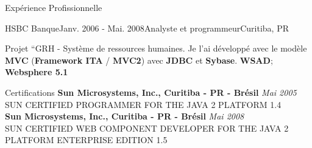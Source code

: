 \documentclass{resume}
\begin{document}
\begin{rSection}{Expérience Profissionnelle}
\begin{rSubsection}{HSBC Banque}{Janv. 2006 - Mai. 2008}{Analyste et programmeur}{Curitiba, PR}
    \item Projet “GRH - Système de ressources humaines. Je l’ai développé avec le modèle \textbf{MVC} (\textbf{Framework ITA} / \textbf{MVC2}) avec \textbf{JDBC} et \textbf{Sybase}. \textbf{WSAD}; \textbf{Websphere 5.1}
    \end{rSubsection}
  \end{rSection}

  \begin{rSection}{Certifications}
    {\bf Sun Microsystems, Inc., Curitiba - PR - Brésil} \hfill {\em Mai 2005} \\ 
    {SUN CERTIFIED PROGRAMMER FOR THE JAVA 2 PLATFORM 1.4} \\

    {\bf Sun Microsystems, Inc., Curitiba - PR - Brésil} \hfill {\em Mai 2008} \\ 
    {SUN CERTIFIED WEB COMPONENT DEVELOPER FOR THE JAVA 2 PLATFORM ENTERPRISE EDITION 1.5} \\
  \end{rSection}
  
\end{document}
